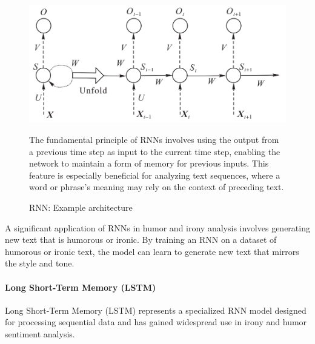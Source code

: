 \documentclass[a4paper]{article}
\begin{document}
\begin{figure}[H]
    \centering
    \begin{minipage}{0.48\textwidth}
        \centering
        \includegraphics[width=1\textwidth]{./images/RNN_architecture.png}
        \caption{RNN: Example architecture \cite{ref_rnn1}}
        \label{fig.RNN}
    \end{minipage}\hfill
    \begin{minipage}{0.48\textwidth}
        The fundamental principle of RNNs involves using the output from a previous time step as input to the current time step, enabling the network to maintain a form of memory for previous inputs. This feature is especially beneficial for analyzing text sequences, where a word or phrase's meaning may rely on the context of preceding text.
    \end{minipage}
\end{figure}

A significant application of RNNs in humor and irony analysis involves generating new text that is humorous or ironic. By training an RNN on a dataset of humorous or ironic text, the model can learn to generate new text that mirrors the style and tone.

\paragraph{Long Short-Term Memory (LSTM)}

Long Short-Term Memory (LSTM) represents a specialized RNN model designed for processing sequential data and has gained widespread use in irony and humor sentiment analysis.
\end{document}
